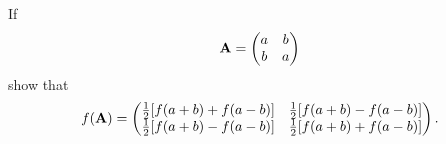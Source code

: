 \documentclass[a4paper]{book}
\newcounter{exercise}[chapter]
\newcounter{solution}[chapter]
\newcommand{\A}{{\bf A}}
\begin{document}
\begin{solution}
\begin{itemize}
	\end{itemize}
	
	\end{solution}
	
	\begin{exercise}
	If
	\begin{equation*}
		\A = \begin{pmatrix} a & b \\ b & a \end{pmatrix}			
	\end{equation*}
	show that
	\begin{equation*}
		f(\A) = \begin{pmatrix}
		\frac{1}{2}[f(a+b)+f(a-b)] & \frac{1}{2}[f(a+b)-f(a-b)] \\
		\frac{1}{2}[f(a+b)-f(a-b)] & \frac{1}{2}[f(a+b)+f(a-b)]
		\end{pmatrix}.
	\end{equation*}
	\end{exercise}
	
\end{document}
